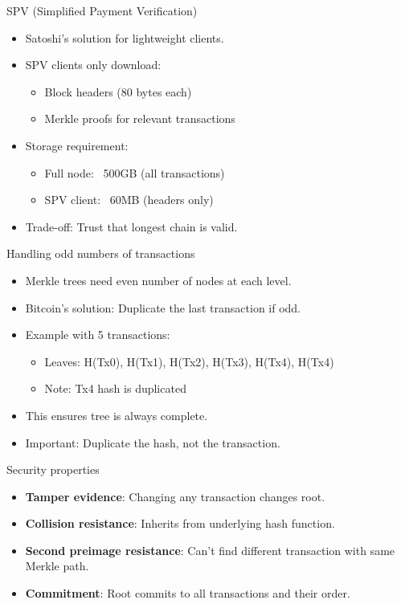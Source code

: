 \documentclass[aspectratio=169, lualatex, handout]{beamer}
\begin{document}
\begin{frame}{SPV (Simplified Payment Verification)}
	\begin{itemize}
		\item Satoshi's solution for lightweight clients.
		\item SPV clients only download:
		      \begin{itemize}
			      \item Block headers (80 bytes each)
			      \item Merkle proofs for relevant transactions
		      \end{itemize}
		\item Storage requirement:
		      \begin{itemize}
			      \item Full node: ~500GB (all transactions)
			      \item SPV client: ~60MB (headers only)
		      \end{itemize}
		\item Trade-off: Trust that longest chain is valid.
	\end{itemize}
\end{frame}

\begin{frame}{Handling odd numbers of transactions}
	\begin{itemize}
		\item Merkle trees need even number of nodes at each level.
		\item Bitcoin's solution: Duplicate the last transaction if odd.
		\item Example with 5 transactions:
		      \begin{itemize}
			      \item Leaves: H(Tx0), H(Tx1), H(Tx2), H(Tx3), H(Tx4), H(Tx4)
			      \item Note: Tx4 hash is duplicated
		      \end{itemize}
		\item This ensures tree is always complete.
		\item Important: Duplicate the hash, not the transaction.
	\end{itemize}
\end{frame}

\begin{frame}{Security properties}
	\begin{itemize}
		\item \textbf{Tamper evidence}: Changing any transaction changes root.
		\item \textbf{Collision resistance}: Inherits from underlying hash function.
		\item \textbf{Second preimage resistance}: Can't find different transaction with same Merkle path.
		\item \textbf{Commitment}: Root commits to all transactions and their order.
	\end{itemize}
\end{frame}
\end{document}
